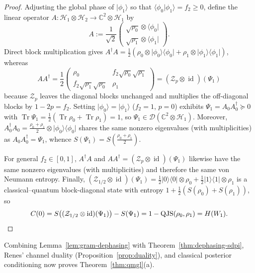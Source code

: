 \documentclass[10pt,a4paper]{article}
\numberwithin{equation}{section}
\theoremstyle{plain}
\theoremstyle{definition}
\theoremstyle{remark}
\DeclareMathOperator{\Tr}{Tr}
\DeclareMathOperator{\QJS}{QJS}
\DeclareMathOperator{\id}{id}
\newcommand{\cH}{\mathcal{H}}
\newcommand{\cD}{\mathcal{D}}
\newcommand{\cZ}{\mathcal{Z}}
\newcommand{\bC}{\mathbb{C}}
\newcommand{\ket}[1]{\lvert #1 \rangle}
\newcommand{\bra}[1]{\langle #1 \rvert}
\newcommand{\ketbra}[1]{\lvert #1 \rangle\langle #1 \rvert}
\newcommand{\braket}[2]{\langle #1 \vert #2 \rangle}
\begin{document}
\begin{proof}
Adjusting the global phase of $\ket{\phi_1}$ so that $\braket{\phi_0}{\phi_1} = f_2 \ge 0$, define the linear operator $A : \cH_1 \otimes \cH_2 \to \bC^2 \otimes \cH_1$ by
\[
A := \frac{1}{\sqrt{2}}
\begin{pmatrix}
\sqrt{\rho_0} \otimes \bra{\phi_0}\\
\sqrt{\rho_1} \otimes \bra{\phi_1}
\end{pmatrix}.
\]
Direct block multiplication gives $A^{\dagger}A = \frac{1}{2}(\rho_0 \otimes \ketbra{\phi_0} + \rho_1 \otimes \ketbra{\phi_1})$, whereas
\[
AA^{\dagger} = \frac{1}{2}
\begin{pmatrix}
\rho_0 & f_2 \sqrt{\rho_0}\sqrt{\rho_1}\\
f_2 \sqrt{\rho_1}\sqrt{\rho_0} & \rho_1
\end{pmatrix}
= (\cZ_p \otimes \id)(\Psi_1)
\]
because $\cZ_p$ leaves the diagonal blocks unchanged and multiplies the off-diagonal blocks by $1 - 2p = f_2$. Setting $\ket{\phi_0} = \ket{\phi_1}$ ($f_2 = 1$, $p = 0$) exhibits $\Psi_1 = A_0 A_0^{\dagger} \succeq 0$ with $\Tr \Psi_1 = \frac{1}{2}(\Tr \rho_0 + \Tr \rho_1) = 1$, so $\Psi_1 \in \cD(\bC^2 \otimes \cH_1)$. Moreover, $A_0^{\dagger} A_0 = \frac{\rho_0 + \rho_1}{2} \otimes \ketbra{\phi_0}$ shares the same nonzero eigenvalues (with multiplicities) as $A_0 A_0^{\dagger} = \Psi_1$, whence $S(\Psi_1) = S(\frac{\rho_0 + \rho_1}{2})$.

For general $f_2 \in [0,1]$, $A^{\dagger}A$ and $AA^{\dagger} = (\cZ_p \otimes \id)(\Psi_1)$ likewise have the same nonzero eigenvalues (with multiplicities) and therefore the same von Neumann entropy. Finally, $(\cZ_{1/2} \otimes \id)(\Psi_1) = \frac{1}{2}\ketbra{0} \otimes \rho_0 + \frac{1}{2}\ketbra{1} \otimes \rho_1$ is a classical--quantum block-diagonal state with entropy $1 + \frac{1}{2}(S(\rho_0) + S(\rho_1))$, so
\[
C(0) = S\bigl((\cZ_{1/2} \otimes \id)(\Psi_1)\bigr) - S(\Psi_1) = 1 - \QJS(\rho_0, \rho_1) = H(W_1). \qedhere
\]
\end{proof}

Combining Lemma~\ref{lem:gram-dephasing} with Theorem~\ref{thm:dephasing-sdpi}, Renes' channel duality (Proposition~\ref{prop:duality}), and classical posterior conditioning now proves Theorem~\ref{thm:qmgl}(a).
\end{document}

